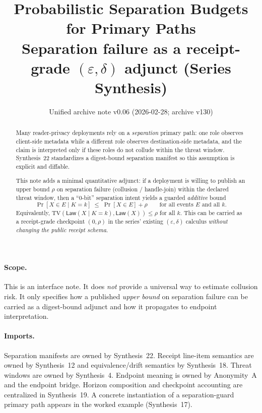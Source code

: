 \documentclass[11pt]{article}
\title{Probabilistic Separation Budgets for Primary Paths\\
\large Separation failure as a receipt-grade $(\varepsilon,\delta)$ adjunct (Series Synthesis)}
\author{}
\date{Unified archive note v0.06 (2026-02-28; archive v130)}
\newcommand{\TV}{\mathrm{TV}}
\newcommand{\Law}{\mathsf{Law}}
\begin{document}
\maketitle

\begin{abstract}
Many reader-privacy deployments rely on a \emph{separation} primary path: one role observes client-side metadata while a different role observes destination-side metadata, and the claim is interpreted only if these roles do not collude within the threat window.
Synthesis~22 standardizes a digest-bound separation manifest so this assumption is explicit and diffable.

This note adds a minimal quantitative adjunct: if a deployment is willing to publish an upper bound $\rho$ on separation failure (collusion / handle-join) within the declared threat window, then a ``0-bit'' separation intent yields a guarded \emph{additive} bound
\[
\Pr[X\in E\mid K=k]\;\le\;\Pr[X\in E]+\rho
\qquad\text{for all events $E$ and all $k$}.
\]
Equivalently, $\TV(\Law(X\mid K=k),\Law(X))\le \rho$ for all $k$.
This can be carried as a receipt-grade checkpoint $(0,\rho)$ in the series' existing $(\varepsilon,\delta)$ calculus \emph{without changing the public receipt schema}.
\end{abstract}

\paragraph{Scope.}
This is an interface note.
It does \emph{not} provide a universal way to estimate collusion risk.
It only specifies how a published \emph{upper bound} on separation failure can be carried as a digest-bound adjunct and how it propagates to endpoint interpretation.

\paragraph{Imports.}
Separation manifests are owned by Synthesis~22.\cite{series:primarysepmanifest}
Receipt line-item semantics are owned by Synthesis~12 and equivalence/drift semantics by Synthesis~18.\cite{series:receiptitems,series:planstateequiv}
Threat windows are owned by Synthesis~4.\cite{series:threatwindows}
Endpoint meaning is owned by Anonymity~A and the endpoint bridge.\cite{series:oddsinflation,series:endpointbridge}
Horizon composition and checkpoint accounting are centralized in Synthesis~19.\cite{series:receiptacct}
A concrete instantiation of a separation-guard primary path appears in the worked example (Synthesis~17).\cite{series:workedexample}
\end{document}
